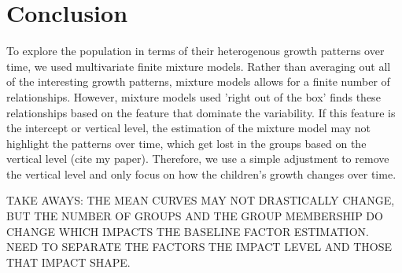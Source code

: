 \section{Conclusion}
To explore the population in terms of their heterogenous growth patterns over time, we used multivariate finite mixture models. Rather than averaging out all of the interesting growth patterns, mixture models allows for a finite number of relationships. However, mixture models used 'right out of the box' finds these relationships based on the feature that dominate the variability. If this feature is the intercept or vertical level, the estimation of the mixture model may not highlight the patterns over time, which get lost in the groups based on the vertical level (cite my paper). Therefore, we use a simple adjustment to remove the vertical level and only focus on how the children's growth changes over time.

TAKE AWAYS: THE MEAN CURVES MAY NOT DRASTICALLY CHANGE, BUT THE NUMBER OF GROUPS AND THE GROUP MEMBERSHIP DO CHANGE WHICH IMPACTS THE BASELINE FACTOR ESTIMATION. NEED TO SEPARATE THE FACTORS THE IMPACT LEVEL AND THOSE THAT IMPACT SHAPE. 

